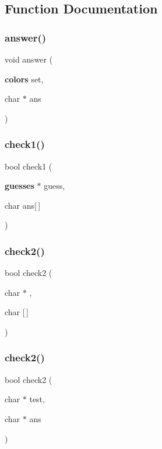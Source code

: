 \subsection{Function Documentation}
\mbox{\label{main_8cpp_aad514542ef691c394466ac3b534db098}} 
\subsubsection{answer()}
{\footnotesize\ttfamily void answer (\begin{DoxyParamCaption}\item[{\textbf{ colors}}]{set,  }\item[{char $\ast$}]{ans }\end{DoxyParamCaption})}

\mbox{\label{main_8cpp_ab8d9a57b9534625b2ac3cf79bb53d8f2}} 
\subsubsection{check1()}
{\footnotesize\ttfamily bool check1 (\begin{DoxyParamCaption}\item[{\textbf{ guesses} $\ast$}]{guess,  }\item[{char}]{ans[$\,$] }\end{DoxyParamCaption})}

\mbox{\label{main_8cpp_a1308d414e1721a483b7532dd77081ba6}} 
\subsubsection{check2()\hspace{0.1cm}{\footnotesize\ttfamily [1/2]}}
{\footnotesize\ttfamily bool check2 (\begin{DoxyParamCaption}\item[{char $\ast$}]{,  }\item[{char}]{[$\,$] }\end{DoxyParamCaption})}

\mbox{\label{main_8cpp_a9529c1d486b1a7fe23fcebe22cea516d}} 
\subsubsection{check2()\hspace{0.1cm}{\footnotesize\ttfamily [2/2]}}
{\footnotesize\ttfamily bool check2 (\begin{DoxyParamCaption}\item[{char $\ast$}]{test,  }\item[{char $\ast$}]{ans }\end{DoxyParamCaption})}

